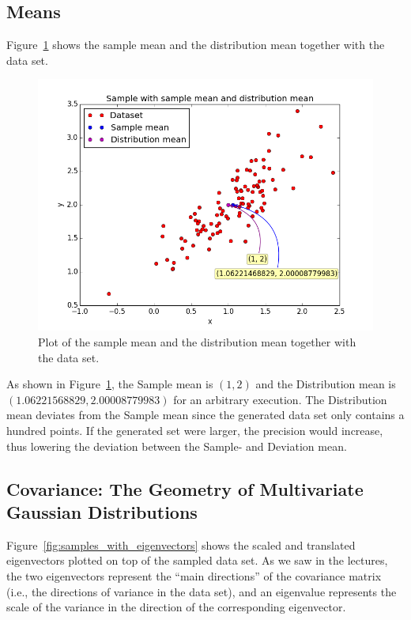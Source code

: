 \documentclass[a4paper]{article}
\begin{document}
\subsection{Means}
Figure~\ref{fig:samples_with_mean} shows the sample mean and the distribution mean together with the data set.

\begin{figure}[H]
  \centering
  \includegraphics[width=.6\linewidth]{figures/samples_with_mean.png}
  \caption{Plot of the sample mean and the distribution mean together with the data set.}
  \label{fig:samples_with_mean}
\end{figure}

As shown in Figure~\ref{fig:samples_with_mean}, the Sample mean is $(1, 2)$ and the Distribution mean is $(1.06221568829, 2.00008779983)$ for an arbitrary execution. The Distribution mean deviates from the Sample mean since the generated data set only contains a hundred points. If the generated set were larger, the precision would increase, thus lowering the deviation between the Sample- and Deviation mean.

\subsection{Covariance: The Geometry of Multivariate Gaussian Distributions}
Figure~\ref{fig:samples_with_eigenvectors} shows the scaled and translated eigenvectors plotted on top of the sampled data set. As we saw in the lectures, the two eigenvectors represent the ``main directions'' of the covariance matrix (i.e., the directions of variance in the data set), and an eigenvalue represents the scale of the variance in the direction of the corresponding eigenvector.
\end{document}
